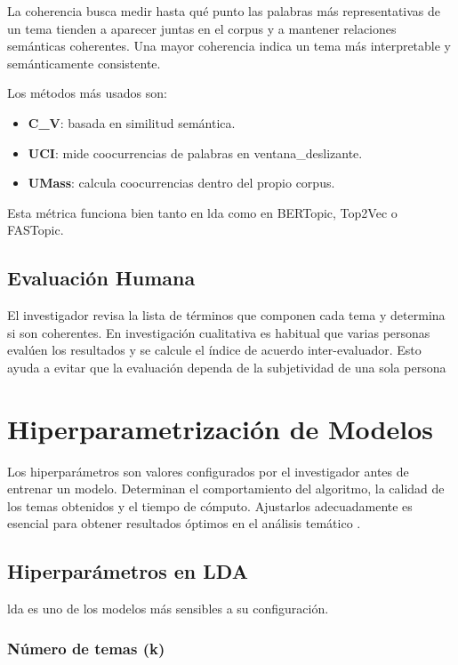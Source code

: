 La \gls{coherencia} busca medir hasta qué punto las palabras más
representativas de un tema tienden a aparecer juntas en el \gls{corpus} y a
mantener relaciones semánticas coherentes. Una mayor \gls{coherencia} indica un
tema más interpretable y semánticamente consistente.

Los métodos más usados son:
\begin{itemize}
	\item \textbf{C\_V}: basada en similitud semántica.
	\item \textbf{UCI}: mide coocurrencias de palabras en \gls{ventana_deslizante}.
	\item \textbf{UMass}: calcula coocurrencias dentro del propio \gls{corpus}.
\end{itemize}

Esta métrica funciona bien tanto en \acrshort{lda} como en BERTopic, Top2Vec o
FASTopic.

\subsection{Evaluación Humana}
El investigador revisa la lista de términos que componen cada tema y determina
si son coherentes. En investigación cualitativa es habitual que varias personas
evalúen los resultados y se calcule el índice de acuerdo inter-evaluador. Esto
ayuda a evitar que la evaluación dependa de la subjetividad de una sola
persona~\cite{vajHowEvaluateNovel2023}

\section{Hiperparametrización de Modelos}
Los hiperparámetros son valores configurados por el investigador antes de
entrenar un modelo. Determinan el comportamiento del algoritmo, la calidad de
los temas obtenidos y el tiempo de cómputo. Ajustarlos adecuadamente es
esencial para obtener resultados óptimos en el análisis temático
\cite{blei2003lda,griffiths2004finding}.

\subsection{Hiperparámetros en LDA}

\acrshort{lda} es uno de los modelos más sensibles a su configuración.

\subsubsection{Número de temas (k)}

